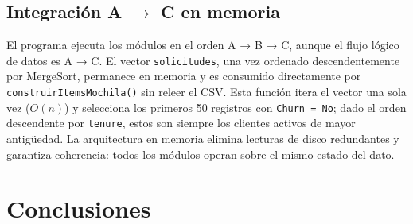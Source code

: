 \documentclass[11pt, a4paper]{article}
\begin{document}
\begin{center}
\end{center}
\vspace{4pt}

\subsection{Integración A $\rightarrow$ C en memoria}

El programa ejecuta los módulos en el orden A → B → C, aunque el flujo lógico de datos
es A → C. El vector \texttt{solicitudes}, una vez ordenado descendentemente por MergeSort,
permanece en memoria y es consumido directamente por \texttt{construirItemsMochila()} sin
releer el CSV. Esta función itera el vector una sola vez ($O(n)$) y selecciona los primeros
50 registros con \texttt{Churn = No}; dado el orden descendente por \texttt{tenure}, estos
son siempre los clientes activos de mayor antigüedad. La arquitectura en memoria elimina
lecturas de disco redundantes y garantiza coherencia: todos los módulos operan sobre el
mismo estado del dato.

\section{Conclusiones}
\end{document}
